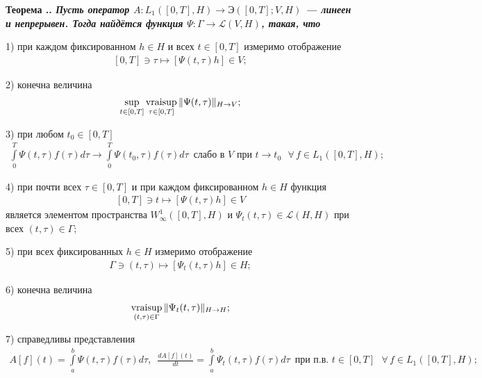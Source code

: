 \documentclass{report}
\newcounter{rem}[section]
\newcounter{theor}[section]
\renewcommand{\thetheor}{\thesection.\arabic{theor}}
\newenvironment{Theorem}{\par\refstepcounter{theor}\bf Теорема \thetheor. \it}{\rm\par}
\newcommand{\vraisup}{\mathop{\rm vraisup}}
\begin{document}
\begin{Theorem}\label{L.L1([0,T],H)->En([0,T];V,H)!theorem}
Пусть оператор $A:L_1([0,T],H)\to\textrm{Э}([0,T];V,H)$ --- линеен и непрерывен. Тогда найдётся функция $\Psi:\Gamma\to\mathcal{L}(V,H)$, такая, что

1) при каждом фиксированном $h\in H$ и всех $t\in[0,T]$ измеримо отображение
\begin{gather}\label{L.L1([0,T],H)->En([0,T];V,H)!tau->Psi(t,tau)h}
[0,T]\ni\tau\mapsto[\Psi(t,\tau)h]\in V;
\end{gather}

2) конечна величина
\begin{gather}\label{L.L1([0,T],H)->En([0,T];V,H)!vraisup.wrt.tau.of.norm(Psi(t,tau))}
\sup\limits_{t\in[0,T]}\vraisup\limits_{\tau\in[0,T]}\|\Psi(t,\tau)\|_{H\to V};
\end{gather}

3) при любом $t_0\in[0,T]$
\begin{gather}\label{L.L1([0,T],H)->En([0,T];V,H)!weak.continuity}
\int\limits_0^T\Psi(t,\tau)f(\tau)d\tau\to\int\limits_0^T\Psi(t_0,\tau)f(\tau)d\tau\,\,\,\text{слабо в $V$ при $t\to t_0$ }\forall\,f\in L_1([0,T],H);
\end{gather}

4) при почти всех $\tau\in[0,T]$ и при каждом фиксированном $h\in H$ функция
\begin{gather}\label{L.L1([0,T],H)->En([0,T];V,H)!t->Psi(t,tau)h}
[0,T]\ni t\mapsto[\Psi(t,\tau)h]\in V
\end{gather}
является элементом пространства $W^1_\infty([0,T],H)$ и $\Psi_t(t,\tau)\in\mathcal{L}(H,H)$ при всех $(t,\tau)\in\Gamma$;

5) при всех фиксированных $h\in H$ измеримо отображение
\begin{gather}\label{L.L1([0,T],H)->En([0,T];V,H)!(t,tau)->Psi.t(t,tau)h}
\Gamma\ni(t,\tau)\mapsto[\Psi_t(t,\tau)h]\in H;
\end{gather}

6) конечна величина
\begin{gather}\label{L.L1([0,T],H)->En([0,T];V,H)!vraisup.wrt.t.tau.of.norm(Psi.t(t,tau))}
\vraisup\limits_{(t,\tau)\in\Gamma}\|\Psi_t(t,\tau)\|_{H\to H};
\end{gather}

7) справедливы представления
\begin{gather}\label{L.L1([0,T],H)->En([0,T];V,H)!representations}
A[f](t)=\int\limits_a^b\Psi(t,\tau)f(\tau)d\tau,\,\,\,\frac{dA[f](t)}{dt}=\int\limits_a^b\Psi_t(t,\tau)f(\tau)d\tau\,\,\,\text{при п.в. $t\in[0,T]$ }\forall\,f\in L_1([0,T],H);
\end{gather}


\end{Theorem}
\end{document}
